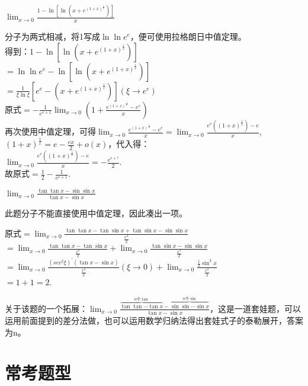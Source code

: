 \begin{example}
	$\lim_{x \to 0}\frac{1-\ln[\ln(x+e^{(1+x)^{\frac{1}{x}}})]}{x}$
	\begin{solution}
		分子为两式相减，将1写成$\ln \ln e^e$，便可使用拉格朗日中值定理。\\
		得到：$1-\ln[\ln(x+e^{(1+x)^{\frac{1}{x}}})]$\\
		$=\ln \ln e^e-\ln[\ln(x+e^{(1+x)^{\frac{1}{x}}})]$\\
		$=\frac{1}{\xi\ln \xi}[e^e-(x+e^{(1+x)^{\frac{1}{x}}})](\xi \to e^e)$\\
		原式$=-\frac{1}{e^{e+1}}\lim_{x \to 0}(1+\frac{e^{(1+x)^{\frac{1}{x}}}-e^e}{x})$\\
		再次使用中值定理，可得$\lim_{x \to 0}\frac{e^{(1+x)^{\frac{1}{x}}}-e^e}{x}=\lim_{x \to 0}\frac{e^e((1+x)^\frac{1}{x})-e}{x}$,\\
		$(1+x)^{\frac{1}{x}}=e-\frac{ex}{2}+o(x)$，代入得：\\
		$\lim_{x \to 0}\frac{e^e((1+x)^\frac{1}{x})-e}{x}=-\frac{e^{e+!}}{2}$.\\
		故原式$=\frac{1}{2}-\frac{1}{e^{e+1}}$.
	\end{solution}
\end{example}

\begin{example}
	$\lim_{x \to 0}\frac{\tan \tan x-\sin \sin x}{\tan x-\sin x}$
	\begin{solution}
		此题分子不能直接使用中值定理，因此凑出一项。

		原式$=\lim_{x \to 0}\frac{\tan \tan x-\tan \sin x+\tan \sin x-\sin \sin x}{\frac{x^3}{2}}$\\
		$=\lim_{x \to 0}\frac{\tan \tan x-\tan \sin x}{\frac{x^3}{2}}+\lim_{x \to 0}\frac{\tan \sin x-\sin \sin x}{\frac{x^3}{2}}$\\
		$=\lim_{x \to 0}\frac{(sec^2\xi)^{'}(\tan x-\sin x)}{\frac{x^3}{2}}(\xi \to 0)+\lim_{x \to 0}\frac{\frac{1}{2}\sin^3x}{\frac{x^3}{2}}$\\
		$=1+1=2$.
	\end{solution}
\end{example}

关于该题的一个拓展：$\lim_{x \to 0}\frac{\overbrace{\tan \tan \cdots \tan x}^{n\text{个}\tan}-\overbrace{\sin \sin \cdots \sin x}^{n\text{个}\sin }}{\tan x-\sin x}$，这是一道套娃题，可以运用前面提到的差分法做，也可以运用数学归纳法得出套娃式子的泰勒展开，答案为n。

\section{常考题型}

